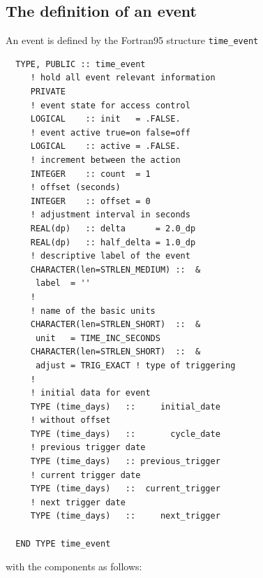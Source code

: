 \documentclass[twoside]{article}
\begin{document}
\subsection{The definition of an event}
An event is defined by the Fortran95 structure \verb|time_event|
%
\begin{verbatim}
  TYPE, PUBLIC :: time_event          
     ! hold all event relevant information
     PRIVATE
     ! event state for access control
     LOGICAL    :: init   = .FALSE.  
     ! event active true=on false=off
     LOGICAL    :: active = .FALSE.    
     ! increment between the action
     INTEGER    :: count  = 1          
     ! offset (seconds)
     INTEGER    :: offset = 0          
     ! adjustment interval in seconds
     REAL(dp)   :: delta      = 2.0_dp 
     REAL(dp)   :: half_delta = 1.0_dp
     ! descriptive label of the event
     CHARACTER(len=STRLEN_MEDIUM) ::  &
      label  = '' 
     !
     ! name of the basic units
     CHARACTER(len=STRLEN_SHORT)  ::  &
      unit   = TIME_INC_SECONDS 
     CHARACTER(len=STRLEN_SHORT)  ::  &
      adjust = TRIG_EXACT ! type of triggering
     !
     ! initial data for event
     TYPE (time_days)   ::     initial_date    
     ! without offset
     TYPE (time_days)   ::       cycle_date     
     ! previous trigger date
     TYPE (time_days)   :: previous_trigger  
     ! current trigger date
     TYPE (time_days)   ::  current_trigger  
     ! next trigger date
     TYPE (time_days)   ::     next_trigger  
     
  END TYPE time_event
\end{verbatim}
%
with the components as follows:
%
\end{document}
